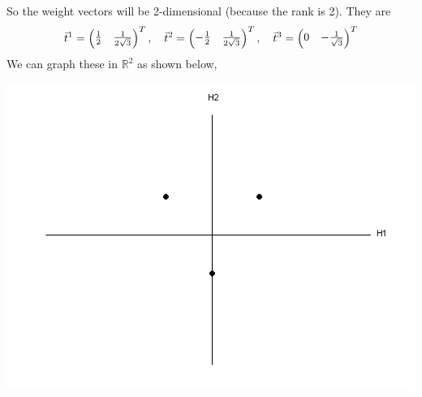 \documentclass[12pt,epsf]{article}
\begin{document}
So the weight vectors will be 2-dimensional (because the rank is
2).  They are
\begin{eqnarray}
\bar t^1 = 
\begin{pmatrix}
{1\over 2} & {1\over 2\sqrt{3}}
\end{pmatrix}^T, \quad \bar t^2 = 
\begin{pmatrix}
-{1\over 2} & {1\over 2\sqrt{3}}
\end{pmatrix}^T, \quad \bar t^3 = 
\begin{pmatrix}
0 & -{1\over \sqrt{3}}
\end{pmatrix}^T \label{eq:su3initial}
\end{eqnarray}
We can graph these in $\mathbb{R}^2$ as shown below,
\begin{center}
\includegraphics[scale = .7]{su3fundamental.PNG} \label{su3fundy}
\end{center}
\end{document}
